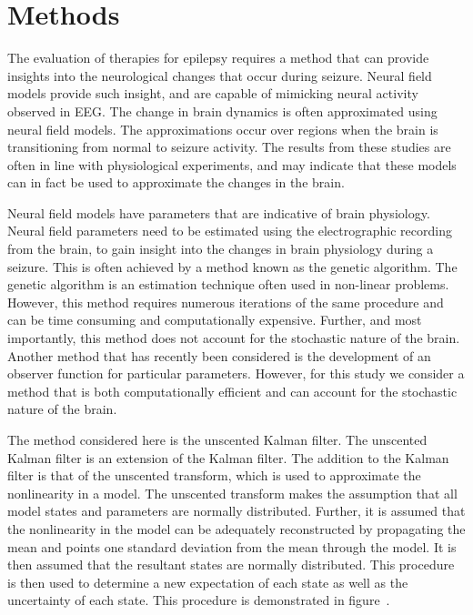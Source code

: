 \section{Methods}

The evaluation of therapies for epilepsy requires a method that can provide insights into the neurological changes that occur during seizure. Neural field models provide such insight, and are capable of mimicking neural activity observed in EEG. The change in brain dynamics is often approximated using neural field models. The approximations occur over regions when the brain is transitioning from normal to seizure activity. The results from these studies are often in line with physiological experiments, and may indicate that these models can in fact be used to approximate the changes in the brain. 

Neural field models have parameters that are indicative of brain physiology. Neural field parameters need to be estimated using the electrographic recording from the brain, to gain insight into the changes in brain physiology during a seizure. This is often achieved by a method known as the genetic algorithm. The genetic algorithm is an estimation technique often used in non-linear problems. However, this method requires numerous iterations of the same procedure and can be time consuming and computationally expensive. Further, and most importantly, this method does not account for the stochastic nature of the brain. Another method that has recently been considered is the development of an observer function for particular parameters. However, for this study we consider a method that is both computationally efficient and can account for the stochastic nature of the brain. 

The method considered here is the unscented Kalman filter. The unscented Kalman filter is an extension of the Kalman filter. The addition to the Kalman filter is that of the unscented transform, which is used to approximate the nonlinearity in a model. The unscented transform makes the assumption that all model states and parameters are normally distributed. Further, it is assumed that the nonlinearity in the model can be adequately reconstructed by propagating the mean and points one standard deviation from the mean through the model. It is then assumed that the resultant states are normally distributed. This procedure is then used to determine a new expectation of each state as well as the uncertainty of each state. This procedure is demonstrated in figure~.

